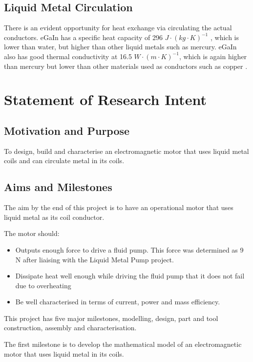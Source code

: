 \documentclass[a4paper,12pt]{article}
\begin{document}
\subsection{Liquid Metal Circulation}
There is an evident opportunity for heat exchange via circulating the actual conductors. eGaIn has a specific heat capacity of 296 $J\cdot (kg\cdot K)^{-1}$ \cite{hodesPotentialGalinstanBasedMinichannel2014}, which is lower than water, but higher than other liquid metals such as mercury. eGaIn also has good thermal conductivity at 16.5 $W\cdot(m\cdot K)^{-1}$, which is again higher than mercury but lower than other materials used as conductors such as copper \cite{naveThermalConductivity2019}.

\newpage

\section{Statement of Research Intent}

\subsection{Motivation and Purpose}

To design, build and characterise an electromagnetic motor that uses liquid metal coils and can circulate metal in its coils.

\subsection{Aims and Milestones}

The aim by the end of this project is to have an operational motor that uses liquid metal as its coil conductor.

The motor should:
\begin{itemize}
    \item Outputs enough force to drive a fluid pump. This force was determined as 9 N after liaising with the Liquid Metal Pump project.
    \item Dissipate heat well enough while driving the fluid pump that it does not fail due to overheating
    \item Be well characterised in terms of current, power and mass efficiency.
\end{itemize}

This project has five major milestones, modelling, design, part and tool construction, assembly and characterisation.

The first milestone is to develop the mathematical model of an electromagnetic motor that uses liquid metal in its coils.
\end{document}
